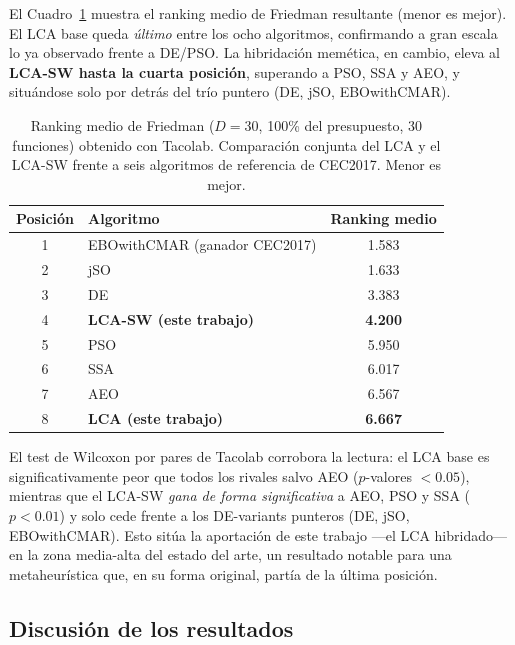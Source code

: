El Cuadro~\ref{tab:tacolab_rank} muestra el ranking medio de Friedman resultante
(menor es mejor). El LCA base queda \emph{último} entre los ocho algoritmos,
confirmando a gran escala lo ya observado frente a DE/PSO. La hibridación
memética, en cambio, eleva al \textbf{LCA-SW hasta la cuarta posición}, superando
a PSO, SSA y AEO, y situándose solo por detrás del trío puntero (DE, jSO,
EBOwithCMAR).

\begin{table}[h!]
\centering
\caption{Ranking medio de Friedman ($D=30$, 100\% del presupuesto, 30 funciones)
obtenido con Tacolab. Comparación conjunta del LCA y el LCA-SW frente a seis
algoritmos de referencia de CEC2017. Menor es mejor.}
\label{tab:tacolab_rank}
\begin{tabular}{clc}
\toprule
Posición & Algoritmo & Ranking medio \\
\midrule
1 & EBOwithCMAR (ganador CEC2017) & 1.583 \\
2 & jSO                           & 1.633 \\
3 & DE                            & 3.383 \\
4 & \textbf{LCA-SW (este trabajo)}& \textbf{4.200} \\
5 & PSO                           & 5.950 \\
6 & SSA                           & 6.017 \\
7 & AEO                           & 6.567 \\
8 & \textbf{LCA (este trabajo)}   & \textbf{6.667} \\
\bottomrule
\end{tabular}
\end{table}

El test de Wilcoxon por pares de Tacolab corrobora la lectura: el LCA base es
significativamente peor que todos los rivales salvo AEO ($p$-valores
$<0.05$), mientras que el LCA-SW \emph{gana de forma significativa} a AEO, PSO y
SSA ($p<0.01$) y solo cede frente a los DE-variants punteros (DE, jSO,
EBOwithCMAR). Esto sitúa la aportación de este trabajo ---el LCA hibridado--- en
la zona media-alta del estado del arte, un resultado notable para una
metaheurística que, en su forma original, partía de la última posición.

\subsection{Discusión de los resultados}

